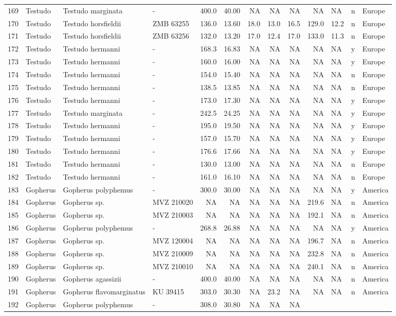 \begin{landscape}
{\begin{longtable}[]{@{}llllrrrrrrlll@{}}
	169 & Testudo & Testudo marginata & - & 400.0 & 40.00 & NA & NA & NA &
	NA & NA & n & Europe\tabularnewline
	170 & Testudo & Testudo horsfieldii & ZMB 63255 & 136.0 & 13.60 & 18.0 &
	13.0 & 16.5 & 129.0 & 12.2 & n & Europe\tabularnewline
	171 & Testudo & Testudo horsfieldii & ZMB 63256 & 132.0 & 13.20 & 17.0 &
	12.4 & 17.0 & 133.0 & 11.3 & n & Europe\tabularnewline
	172 & Testudo & Testudo hermanni & - & 168.3 & 16.83 & NA & NA & NA & NA
	& NA & y & Europe\tabularnewline
	173 & Testudo & Testudo hermanni & - & 160.0 & 16.00 & NA & NA & NA & NA
	& NA & y & Europe\tabularnewline
	174 & Testudo & Testudo hermanni & - & 154.0 & 15.40 & NA & NA & NA & NA
	& NA & n & Europe\tabularnewline
	175 & Testudo & Testudo hermanni & - & 138.5 & 13.85 & NA & NA & NA & NA
	& NA & n & Europe\tabularnewline
	176 & Testudo & Testudo hermanni & - & 173.0 & 17.30 & NA & NA & NA & NA
	& NA & y & Europe\tabularnewline
	177 & Testudo & Testudo marginata & - & 242.5 & 24.25 & NA & NA & NA &
	NA & NA & y & Europe\tabularnewline
	178 & Testudo & Testudo hermanni & - & 195.0 & 19.50 & NA & NA & NA & NA
	& NA & y & Europe\tabularnewline
	179 & Testudo & Testudo hermanni & - & 157.0 & 15.70 & NA & NA & NA & NA
	& NA & y & Europe\tabularnewline
	180 & Testudo & Testudo hermanni & - & 176.6 & 17.66 & NA & NA & NA & NA
	& NA & y & Europe\tabularnewline
	181 & Testudo & Testudo hermanni & - & 130.0 & 13.00 & NA & NA & NA & NA
	& NA & n & Europe\tabularnewline
	182 & Testudo & Testudo hermanni & - & 161.0 & 16.10 & NA & NA & NA & NA
	& NA & n & Europe\tabularnewline
	183 & Gopherus & Gopherus polyphemus & - & 300.0 & 30.00 & NA & NA & NA
	& NA & NA & y & America\tabularnewline
	184 & Gopherus & Gopherus sp. & MVZ 210020 & NA & NA & NA & NA & NA &
	219.6 & NA & n & America\tabularnewline
	185 & Gopherus & Gopherus sp. & MVZ 210003 & NA & NA & NA & NA & NA &
	192.1 & NA & n & America\tabularnewline
	186 & Gopherus & Gopherus polyphemus & - & 268.8 & 26.88 & NA & NA & NA
	& NA & NA & y & America\tabularnewline
	187 & Gopherus & Gopherus sp. & MVZ 120004 & NA & NA & NA & NA & NA &
	196.7 & NA & n & America\tabularnewline
	188 & Gopherus & Gopherus sp. & MVZ 210009 & NA & NA & NA & NA & NA &
	232.8 & NA & n & America\tabularnewline
	189 & Gopherus & Gopherus sp. & MVZ 210010 & NA & NA & NA & NA & NA &
	240.1 & NA & n & America\tabularnewline
	190 & Gopherus & Gopherus agassizii & - & 400.0 & 40.00 & NA & NA & NA &
	NA & NA & n & America\tabularnewline
	191 & Gopherus & Gopherus flavomarginatus & KU 39415 & 303.0 & 30.30 &
	NA & 23.2 & NA & NA & NA & n & America\tabularnewline
	192 & Gopherus & Gopherus polyphemus & - & 308.0 & 30.80 & NA & NA & NA

\end{longtable}}
\end{landscape}
